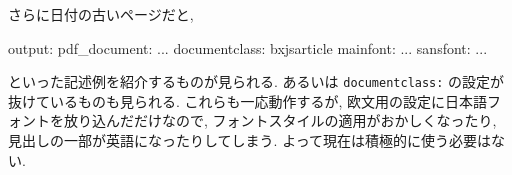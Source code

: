 \documentclass[
  letterpaper,
  DIV=11,
  pandoc,
  ja=standard,
  jafont=noto-otf]{bxjsarticle}
\newenvironment{Shaded}{\begin{snugshade}}{\end{snugshade}}
\newcommand{\AttributeTok}[1]{\textcolor[rgb]{0.00,0.48,0.65}{#1}}
\newcommand{\FunctionTok}[1]{\textcolor[rgb]{0.28,0.35,0.67}{#1}}
\newcommand{\KeywordTok}[1]{\textcolor[rgb]{0.00,0.48,0.65}{#1}}
\begin{document}
さらに日付の古いページだと,

\begin{Shaded}
\begin{Highlighting}[]
\FunctionTok{output}\KeywordTok{:}
\AttributeTok{  }\FunctionTok{pdf\_document}\KeywordTok{:}
\AttributeTok{    ...}
\FunctionTok{documentclass}\KeywordTok{:}\AttributeTok{ bxjsarticle}
\FunctionTok{mainfont}\KeywordTok{:}\AttributeTok{ ...}
\FunctionTok{sansfont}\KeywordTok{:}\AttributeTok{ ...}
\end{Highlighting}
\end{Shaded}

といった記述例を紹介するものが見られる. あるいは \texttt{documentclass:}
の設定が抜けているものも見られる. これらも一応動作するが,
欧文用の設定に日本語フォントを放り込んだだけなので,
フォントスタイルの適用がおかしくなったり,
見出しの一部が英語になったりしてしまう.
よって現在は積極的に使う必要はない.
\end{document}
